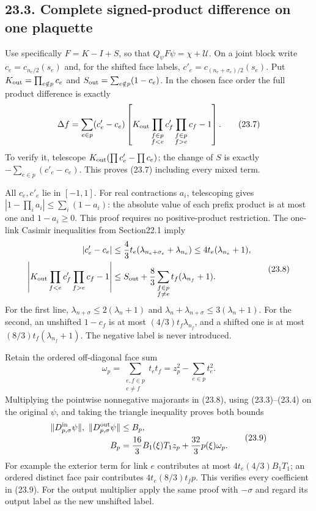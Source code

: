 \documentclass[
]{article}
\begin{document}
\subsection{23.3. Complete signed-product difference on one
plaquette}\label{complete-signed-product-difference-on-one-plaquette}

Use specifically \(F=K-I+S\), so that \(Q_\psi F\psi=\chi+\mathcal U\).
On a joint block write \(c_e=c_{n_e/2}(s_e)\) and, for the shifted face
labels, \(c'_e=c_{(n_e+\sigma_e)/2}(s_e)\). Put
\(K_{\rm out}=\prod_{e\notin p}c_e\) and
\(S_{\rm out}=\sum_{e\notin p}(1-c_e)\). In the chosen face order the
full product difference is exactly \[
\Delta f
 =\sum_{e\in p}(c'_e-c_e)
   \left[
     K_{\rm out}\prod_{\substack{f\in p\\f<e}}c'_f
                   \prod_{\substack{f\in p\\f>e}}c_f-1
   \right].
\tag{23.7}
\] To verify it, telescope \(K_{\rm out}(\prod c'_e-\prod c_e)\); the
change of \(S\) is exactly \(-\sum_{e\in p}(c'_e-c_e)\). This proves
(23.7) including every mixed term.

All \(c_e,c'_e\) lie in \([-1,1]\). For real contractions \(a_i\),
telescoping gives \(\left|1-\prod_i a_i\right|\le\sum_i(1-a_i)\): the
absolute value of each prefix product is at most one and \(1-a_i\ge0\).
This proof requires no positive-product restriction. The one-link
Casimir inequalities from Section22.1 imply \[
\begin{aligned}
|c'_e-c_e|
 &\le\frac43t_e(\lambda_{n_e+\sigma_e}+\lambda_{n_e})
 \le4t_e(\lambda_{n_e}+1),\\
\left|
K_{\rm out}\prod_{f<e}c'_f\prod_{f>e}c_f-1
\right|
 &\le S_{\rm out}
     +\frac83\sum_{\substack{f\in p\\f\ne e}}
                 t_f(\lambda_{n_f}+1).
\end{aligned}\tag{23.8}
\] For the first line, \(\lambda_{n+\sigma}\le2(\lambda_n+1)\) and
\(\lambda_n+\lambda_{n+\sigma}\le3(\lambda_n+1)\). For the second, an
unshifted \(1-c_f\) is at most \((4/3)t_f\lambda_{n_f}\), and a shifted
one is at most \((8/3)t_f(\lambda_{n_f}+1)\). The negative label is
never introduced.

Retain the ordered off-diagonal face sum \[
\omega_p=\sum_{\substack{e,f\in p\\e\ne f}}t_et_f
         =z_p^2-\sum_{e\in p}t_e^2 .
\] Multiplying the pointwise nonnegative majorants in (23.8), using
(23.3)--(23.4) on the original \(\psi\), and taking the triangle
inequality proves both bounds \[
\begin{aligned}
\|D^{\rm in}_{p,\sigma}\psi\|,\ 
\|D^{\rm out}_{p,\sigma}\psi\|
 &\le B_p,\\
B_p&=\frac{16}{3}B_1(\xi)T_1z_p
                 +\frac{32}{3}p(\xi)\omega_p .
\end{aligned}\tag{23.9}
\] For example the exterior term for link \(e\) contributes at most
\(4t_e(4/3)B_1T_1\); an ordered distinct face pair contributes
\(4t_e(8/3)t_fp\). This verifies every coefficient in (23.9). For the
output multiplier apply the same proof with \(-\sigma\) and regard its
output label as the new unshifted label.
\end{document}
